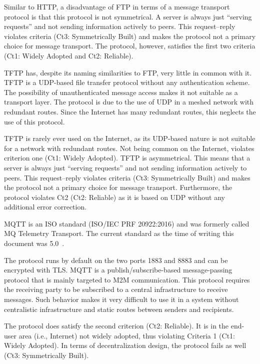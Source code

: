Similar to HTTP, a disadvantage of FTP in terms of a message transport protocol is that this protocol is not symmetrical. A server is always just ``serving requests'' and not sending information actively to peers. This request--reply violates criteria (Ct3: Symmetrically Built) and makes the protocol not a primary choice for message transport. The protocol, however, satisfies the first two criteria (Ct1: Widely Adopted and Ct2: Reliable).

TFTP has, despite its naming similarities to FTP, very little in common with it. TFTP is a UDP-based file transfer protocol without any authentication scheme. The possibility of unauthenticated message access makes it not suitable as a transport layer. The protocol is due to the use of UDP in a meshed network with redundant routes. Since the Internet has many redundant routes, this neglects the use of this protocol.

TFTP is rarely ever used on the Internet, as its UDP-based nature is not suitable for a network with redundant routes. Not being common on the Internet, violates criterion one (Ct1: Widely Adopted). TFTP is asymmetrical. This means that a server is always just ``serving requests'' and not sending information actively to peers. This request--reply violates criteria (Ct3: Symmetrically Built) and makes the protocol not a primary choice for message transport. Furthermore, the protocol violates Ct2 (Ct2: Reliable) as it is based on UDP without any additional error correction.

MQTT is an ISO standard (ISO/IEC PRF 20922:2016) and was formerly called MQ Telemetry Transport. The current standard as the time of writing this document was 5.0~\cite{mqtt}. 

The protocol runs by default on the two ports 1883 and 8883 and can be encrypted with TLS. MQTT is a publish/subscribe-based message-passing protocol that is mainly targeted to M2M communication. This protocol requires the receiving party to be subscribed to a central infrastructure to receive messages. Such behavior makes it very difficult to use it in a system without centralistic infrastructure and static routes between senders and recipients. 

The protocol does satisfy the second criterion (Ct2: Reliable). It is in the end-user area (i.e., Internet) not widely adopted, thus violating Criteria 1 (Ct1: Widely Adopted). In terms of decentralization design, the protocol fails as well (Ct3: Symmetrically Built).

